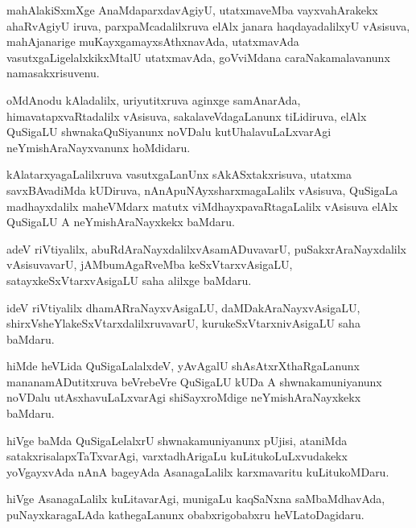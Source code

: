 \documentclass{article}
\begin{document}
\begin{mn}
mahAlakiSxmXge AnaMdaparxdavAgiyU, utatxmaveMba vayxvahArakekx ahaRvAgiyU 
iruva, parxpaMcadalilxruva elAlx janara haqdayadalilxyU
vAsisuva, mahAjanarige muKayxgamayxsAthxnavAda, utatxmavAda 
vasutxgaLigelalxkikxMtalU utatxmavAda, goVviMdana caraNakamalavanunx 
namasakxrisuvenu.
\end{mn}

\begin{mn}
oMdAnodu kAladalilx, uriyutitxruva aginxge samAnarAda, himavatapxvaRtadalilx 
vAsisuva, sakalaveVdagaLanunx tiLidiruva, elAlx QuSigaLU     
shwnakaQuSiyanunx  noVDalu kutUhalavuLaLxvarAgi neYmishAraNayxvanunx hoMdidaru.
\end{mn}

\begin{mn}
kAlatarxyagaLalilxruva vasutxgaLanUnx sAkASxtakxrisuva, utatxma 
savxBAvadiMda kUDiruva, nAnApuNAyxsharxmagaLalilx vAsisuva, QuSigaLa 
madhayxdalilx maheVMdarx matutx viMdhayxpavaRtagaLalilx vAsisuva elAlx 
QuSigaLU A neYmishAraNayxkekx baMdaru.
\end{mn}

\begin{mn}
adeV riVtiyalilx, abuRdAraNayxdalilxvAsamADuvavarU, 
puSakxrAraNayxdalilx vAsisuvavarU, jAMbumAgaRveMba keSxVtarxvAsigaLU, 
satayxkeSxVtarxvAsigaLU saha alilxge baMdaru.
\end{mn}

\begin{mn}
ideV riVtiyalilx dhamARraNayxvAsigaLU, daMDakAraNayxvAsigaLU, 
shirxVsheYlakeSxVtarxdalilxruvavarU, kurukeSxVtarxnivAsigaLU saha 
baMdaru.
\end{mn}

\begin{mn}
hiMde heVLida QuSigaLalalxdeV, yAvAgalU shAsAtxrXthaRgaLanunx 
mananamADutitxruva beVrebeVre QuSigaLU kUDa A shwnakamuniyanunx 
noVDalu utAsxhavuLaLxvarAgi shiSayxroMdige neYmishAraNayxkekx baMdaru.
\end{mn}

\begin{mn}
hiVge baMda QuSigaLelalxrU shwnakamuniyanunx pUjisi, ataniMda 
satakxrisalapxTaTxvarAgi, varxtadhArigaLu kuLitukoLuLxvudakekx 
yoVgayxvAda nAnA bageyAda AsanagaLalilx karxmavaritu kuLitukoMDaru.
\end{mn}

\begin{mn}
hiVge AsanagaLalilx kuLitavarAgi, munigaLu kaqSaNxna saMbaMdhavAda, 
puNayxkaragaLAda kathegaLanunx obabxrigobabxru heVLatoDagidaru.
\end{mn}
\end{document}
